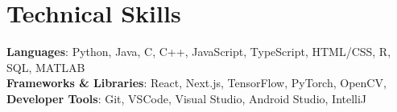 \documentclass[letterpaper,11pt]{article}
\begin{document}
\section{Technical Skills}
\begin{itemize}[leftmargin=0.15in, label={}]
  \small{\item{
  \textbf{Languages}{: Python, Java, C, C++, JavaScript, TypeScript, HTML/CSS, R, SQL, MATLAB} \\
  \textbf{Frameworks \& Libraries}{: React, Next.js, TensorFlow, PyTorch, OpenCV, } \\
  \textbf{Developer Tools}{: Git, VSCode, Visual Studio, Android Studio, IntelliJ} \\
  }}
\end{itemize}

\end{document}
